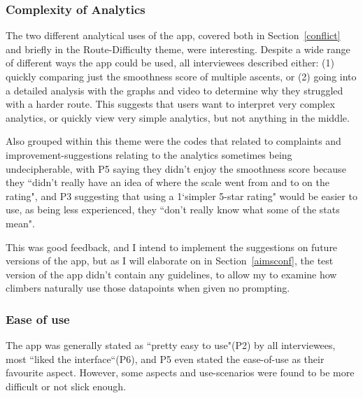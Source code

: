 \subsubsection{Complexity of Analytics}
The two different analytical uses of the app, covered both in Section~\ref{conflict} and briefly in the Route-Difficulty theme, were interesting.
Despite a wide range of different ways the app could be used, all interviewees described either: (1) quickly comparing just the smoothness score of multiple ascents, or (2) going into a detailed analysis with the graphs and video to determine why they struggled with a harder route.
This suggests that users want to interpret very complex analytics, or quickly view very simple analytics, but not anything in the middle.

Also grouped within this theme were the codes that related to complaints and improvement-suggestions relating to the analytics sometimes being undecipherable, with P5 saying they didn't enjoy the smoothness score because they ``didn't really have an idea of where the scale went from and to on the rating", and P3 suggesting that using a 1`simpler 5-star rating" would be easier to use, as being less experienced, they ``don't really know what some of the stats mean".

This was good feedback, and I intend to implement the suggestions on future versions of the app, but as I will elaborate on in Section~\ref{aimsconf}, the test version of the app didn't contain any guidelines, to allow my to examine how climbers naturally use those datapoints when given no prompting.

\subsubsection{Ease of use}
The app was generally stated as ``pretty easy to use"(P2) by all interviewees, most ``liked the interface``(P6), and P5 even stated the ease-of-use as their favourite aspect. However, some aspects and use-scenarios were found to be more difficult or not slick enough.

